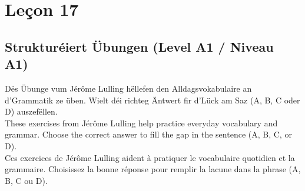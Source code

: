 \chapter{Leçon 17}

\section{Strukturéiert Übungen (Level A1 / Niveau A1)}

Dës Übunge vum Jérôme Lulling hëllefen den Alldagsvokabulaire an d'Grammatik ze üben. Wielt déi richteg Äntwert fir d'Lück am Saz (A, B, C oder D) auszefëllen. \\
These exercises from Jérôme Lulling help practice everyday vocabulary and grammar. Choose the correct answer to fill the gap in the sentence (A, B, C, or D). \\
Ces exercices de Jérôme Lulling aident à pratiquer le vocabulaire quotidien et la grammaire. Choisissez la bonne réponse pour remplir la lacune dans la phrase (A, B, C ou D).

